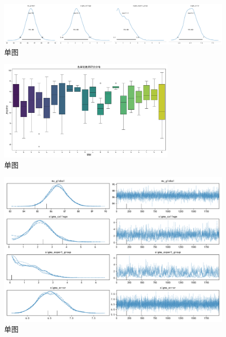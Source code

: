 \documentclass[withoutpreface,bwprint]{cumcmthesis}
\begin{document}
\begin{figure}[H]
\centering
\includegraphics[width=1\textwidth]{figures/Diagnostics/posterior_plots.png}
\caption{单图}
\label{fig:单图}
\end{figure}


\begin{figure}[H]
\centering
\includegraphics[width=0.75\textwidth]{figures/EDA/college_scores_boxplot.png}
\caption{单图}
\label{fig:单图}
\end{figure}


\begin{figure}[H]
\centering
\includegraphics[width=1\textwidth]{figures/Diagnostics/trace_plots.png}
\caption{单图}
\label{fig:单图}
\end{figure}
\end{document}
